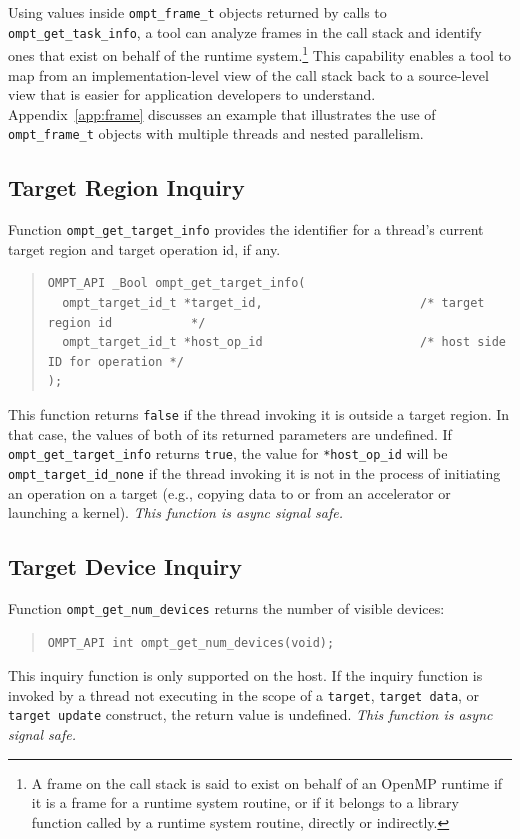 \documentclass{article}
\begin{document}
Using values inside  \lstinline|ompt_frame_t| objects returned by calls to  \lstinline|ompt_get_task_info|, a tool can analyze  frames in the call stack and identify ones that exist on behalf of the runtime system.\footnote{A frame on the call stack is said to exist on behalf of an OpenMP runtime if it is a frame for a runtime system routine, or if it belongs to a library function called by a runtime system routine, directly or indirectly.} 
This capability enables a tool to map from an implementation-level view of the call stack back to a source-level view that is easier for application developers to understand. 
Appendix~\ref{app:frame} discusses  an example that illustrates the use of \lstinline|ompt_frame_t| objects with multiple threads and nested parallelism.

\subsection{Target Region Inquiry}
\label{sec:target-region}

Function \lstinline|ompt_get_target_info| provides the identifier for a thread's current target region and target operation id, if any.
\begin{quote}
\begin{lstlisting}
OMPT_API _Bool ompt_get_target_info(
  ompt_target_id_t *target_id,                      /* target region id           */
  ompt_target_id_t *host_op_id                      /* host side ID for operation */
);
\end{lstlisting}
\end{quote}
This function returns \lstinline|false| if the thread invoking it is
outside a target region. In that case, the values of both of its
returned parameters are undefined. If \lstinline|ompt_get_target_info|
returns \lstinline|true|, the value for \lstinline|*host_op_id| will be
\lstinline|ompt_target_id_none| if the thread invoking it is not in the process of initiating an operation on a target (e.g., copying data to or from an accelerator or launching a kernel).  {\em This function is async signal safe.}

\subsection{Target Device Inquiry}
\label{sec:target-device}
Function \lstinline|ompt_get_num_devices| returns the number of visible devices:
\begin{quote}
\begin{lstlisting}
OMPT_API int ompt_get_num_devices(void);
\end{lstlisting}
\end{quote}
This inquiry function is only supported on the host. If the inquiry function is invoked by a thread not executing in the scope of a {\tt target}, {\tt target data}, or {\tt target update} construct, the return value is undefined. {\it This function is async signal safe.}
\end{document}
